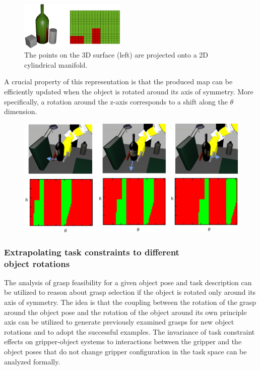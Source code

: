 \documentclass{aamas2015}
\begin{document}
\begin{figure}[ht!]
  \begin{center}
    \includegraphics[width=0.45\textwidth]{./images/bottlemapping.png} \quad
  \end{center}
  \caption{The points on the 3D surface (left) are projected onto a 2D cylindrical manifold.}
  \label{fig:unfolding} 
\end{figure}


A crucial property of this representation is that the produced map can
be efficiently updated when the object is rotated around its axis of symmetry. More specifically, a
rotation around the z-axis corresponds to a shift along the $\theta$ dimension. 

\begin{figure}[t]
  \begin{center}
    \includegraphics[width=0.75\linewidth]{./images/rotatingWine.png} \quad
  \end{center}
  \label{fig:unfolding} 
\end{figure}

\newpage
\subsubsection{Extrapolating task constraints to different \\object rotations}

The analysis of grasp feasibility for a given object pose and task description can be utilized to reason
about grasp selection if the object is rotated only around its axis of symmetry. The idea is that the 
coupling between the rotation of the grasp around the object pose and the rotation of the object around
its own principle axis can be utilized to generate previously examined grasps for new object rotations
and to adopt the successful examples. The invariance of task constraint effects on gripper-object
systems to interactions between the gripper and the object poses that do not change gripper configuration
in the task space can be analyzed formally. 
\end{document}
